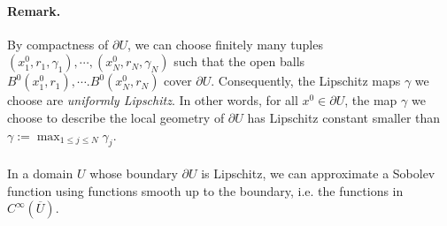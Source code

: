 \documentclass{article}
\numberwithin{equation}{section}
\newcommand{\ol}{\overline}
\theoremstyle{plain}
\theoremstyle{definition}
\begin{document}
\paragraph{Remark.} By compactness of $\partial U$, we can choose finitely many tuples $(x_1^0,r_1,\gamma_1),\cdots,(x_N^0,r_N,\gamma_N)$ such that the open balls $B^0(x^0_1,r_1),\cdots.B^0(x^0_N,r_N)$ cover $\partial U$. Consequently, the Lipschitz maps $\gamma$ we choose are \textit{uniformly Lipschitz}. In other words, for all $x^0\in\partial U$, the map $\gamma$ we choose to describe the local geometry of $\partial U$ has Lipschitz constant smaller than $\gamma:=\max_{1\leq j\leq N}\gamma_j$.

\paragraph{} In a domain $U$ whose boundary $\partial U$ is Lipschitz, we can approximate a Sobolev function using functions smooth up to the boundary, i.e. the functions in $C^\infty(\ol{U})$.
\end{document}
